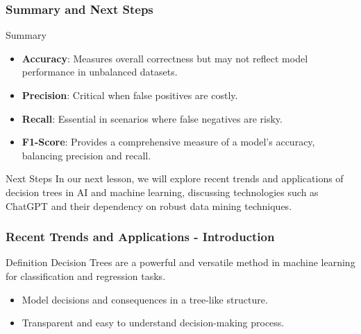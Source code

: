 \documentclass[aspectratio=169]{beamer}
\begin{document}
\begin{frame}[fragile]
    \frametitle{Summary and Next Steps}
    \begin{block}{Summary}
        \begin{itemize}
            \item \textbf{Accuracy}: Measures overall correctness but may not reflect model performance in unbalanced datasets.
            \item \textbf{Precision}: Critical when false positives are costly.
            \item \textbf{Recall}: Essential in scenarios where false negatives are risky.
            \item \textbf{F1-Score}: Provides a comprehensive measure of a model’s accuracy, balancing precision and recall.
        \end{itemize}
    \end{block}

    \begin{block}{Next Steps}
        In our next lesson, we will explore recent trends and applications of decision trees in AI and machine learning, discussing technologies such as ChatGPT and their dependency on robust data mining techniques.
    \end{block}
\end{frame}

\begin{frame}[fragile]
    \frametitle{Recent Trends and Applications - Introduction}
    \begin{block}{Definition}
        Decision Trees are a powerful and versatile method in machine learning for classification and regression tasks.
    \end{block}
    \begin{itemize}
        \item Model decisions and consequences in a tree-like structure.
        \item Transparent and easy to understand decision-making process.
    \end{itemize}
\end{frame}
\end{document}
